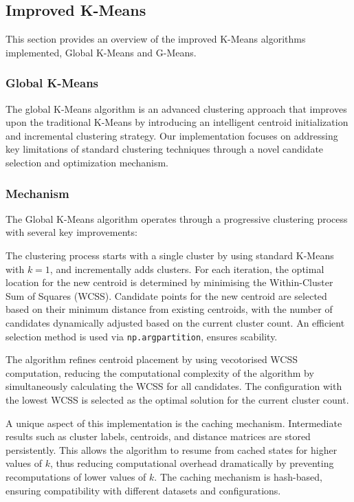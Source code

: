 \subsection{Improved K-Means}
\label{subsec:methods-improved-kmeans}

This section provides an overview of the improved K-Means algorithms implemented, Global K-Means and G-Means.

\subsubsection{Global K-Means}
\label{subsec:globalkmeansdiscussion}

The global K-Means algorithm is an advanced clustering approach that improves upon the
traditional K-Means by introducing an intelligent centroid initialization and incremental clustering strategy.
Our implementation focuses on addressing key limitations of standard clustering techniques
through a novel candidate selection and optimization mechanism.

\subsubsection*{Mechanism}
The Global K-Means algorithm operates through a progressive clustering process with several key improvements:

The clustering process starts with a single cluster by using standard K-Means with \(k=1\), and incrementally adds clusters.
For each iteration, the optimal location for the new centroid is determined by minimising the Within-Cluster Sum of Squares (WCSS).
Candidate points for the new centroid are selected based on their minimum distance from existing centroids, with the
number of candidates dynamically adjusted based on the current cluster count. An efficient selection method is
used via \texttt{np.argpartition}, ensures scability.

The algorithm refines centroid placement by using vecotorised WCSS computation, reducing the computational
complexity of the algorithm by simultaneously calculating the WCSS for all candidates. The configuration with the lowest
WCSS is selected as the optimal solution for the current cluster count.

A unique aspect of this implementation is the caching mechanism. Intermediate results such as cluster labels, centroids, and
distance matrices are stored persistently. This allows the algorithm to resume from cached states for higher values of \(k\),
thus reducing computational overhead dramatically by preventing recomputations of lower values of \(k\).
The caching mechanism is hash-based, ensuring compatibility with different datasets and configurations.

